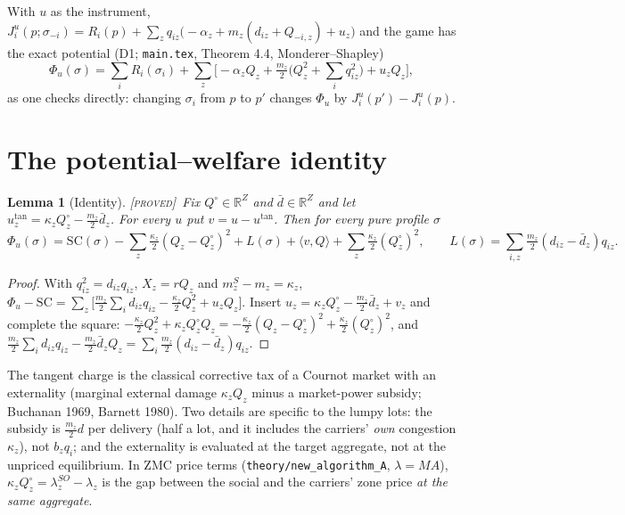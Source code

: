 \documentclass[11pt]{article}
\newtheorem{lemma}[theorem]{Lemma}
\theoremstyle{definition}
\theoremstyle{remark}
\newcommand{\R}{\mathbb{R}}
\newcommand{\ip}[2]{\langle #1,#2\rangle}
\newcommand{\dbar}{\bar d}
\newcommand{\SC}{\mathrm{SC}}
\newcommand{\PROVED}{{\normalfont\textsc{[proved]}}}
\begin{document}
With $u$ as the instrument, $J^u_i(p;\sigma_{-i})=R_i(p)+\sum_zq_{iz}\big(-\alpha_z+m_z(d_{iz}+Q_{-i,z})+u_z\big)$ and the game has the exact potential (D1; \texttt{main.tex}, Theorem 4.4, Monderer--Shapley)
\[\Phi_u(\sigma)=\sum_iR_i(\sigma_i)+\sum_z\Big[-\alpha_zQ_z+\tfrac{m_z}{2}\big(Q_z^2+\textstyle\sum_iq_{iz}^2\big)+u_zQ_z\Big],\]
as one checks directly: changing $\sigma_i$ from $p$ to $p'$ changes $\Phi_u$ by $J^u_i(p')-J^u_i(p)$.

\section{The potential--welfare identity}

\begin{lemma}[Identity]\label{lem:identity}\PROVED\
Fix $Q^\circ\in\R^Z$ and $\dbar\in\R^Z$ and let $u^{\tan}_z=\kappa_zQ^\circ_z-\tfrac{m_z}{2}\dbar_z$. For every $u$ put $v=u-u^{\tan}$. Then for every pure profile $\sigma$
\begin{equation}\label{eq:id}
\Phi_u(\sigma)=\SC(\sigma)-\sum_z\tfrac{\kappa_z}{2}(Q_z-Q^\circ_z)^2+L(\sigma)+\ip{v}{Q}+\sum_z\tfrac{\kappa_z}{2}(Q^\circ_z)^2,
\qquad L(\sigma)=\sum_{i,z}\tfrac{m_z}{2}(d_{iz}-\dbar_z)q_{iz}.
\end{equation}
\end{lemma}
\begin{proof}
With $q_{iz}^2=d_{iz}q_{iz}$, $X_z=rQ_z$ and $m^S_z-m_z=\kappa_z$,
$\Phi_u-\SC=\sum_z\big[\tfrac{m_z}{2}\sum_id_{iz}q_{iz}-\tfrac{\kappa_z}{2}Q_z^2+u_zQ_z\big]$.
Insert $u_z=\kappa_zQ^\circ_z-\tfrac{m_z}{2}\dbar_z+v_z$ and complete the square:
$-\tfrac{\kappa_z}{2}Q_z^2+\kappa_zQ^\circ_zQ_z=-\tfrac{\kappa_z}{2}(Q_z-Q_z^\circ)^2+\tfrac{\kappa_z}{2}(Q^\circ_z)^2$, and $\tfrac{m_z}{2}\sum_id_{iz}q_{iz}-\tfrac{m_z}{2}\dbar_zQ_z=\sum_i\tfrac{m_z}{2}(d_{iz}-\dbar_z)q_{iz}$.
\end{proof}

The tangent charge is the classical corrective tax of a Cournot market with an externality (marginal external damage $\kappa_zQ_z$ minus a market-power subsidy; Buchanan 1969, Barnett 1980). Two details are specific to the lumpy lots: the subsidy is $\tfrac{m_z}{2}d$ per delivery (half a lot, and it includes the carriers' \emph{own} congestion $\kappa_z$), not $b_zq_i$; and the externality is evaluated at the target aggregate, not at the unpriced equilibrium. In ZMC price terms (\texttt{theory/new\_algorithm\_A}, $\lambda=MA$), $\kappa_zQ^\circ_z=\lambda^{SO}_z-\lambda_z$ is the gap between the social and the carriers' zone price \emph{at the same aggregate}.
\end{document}
